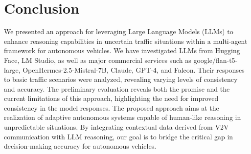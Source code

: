 \documentclass[conference]{IEEEtran}
\begin{document}






\section{Conclusion}
We presented an approach for leveraging Large Language Models (LLMs) to enhance reasoning capabilities in uncertain traffic situations within a multi-agent framework for autonomous vehicles. We have investigated LLMs from Hugging Face, LM Studio, as well as major commercial services such as google/flan-t5-large, OpenHermes-2.5-Mistral-7B, Claude, GPT-4, and Falcon. Their responses to basic traffic scenarios were analyzed, revealing varying levels of consistency and accuracy. The preliminary evaluation reveals both the promise and the current limitations of this approach, highlighting the need for improved consistency in the model responses. The proposed approach aims at the realization of adaptive autonomous systems capable of human-like reasoning in unpredictable situations. 
By integrating contextual data derived from V2V communication with LLM reasoning, our goal is to bridge the critical gap in decision-making accuracy for autonomous vehicles.
\end{document}

